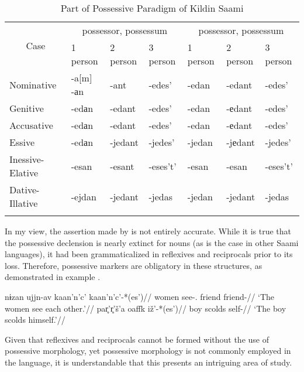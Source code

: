 \begin{table}[ht]
\centering
\begin{tabular}{lllllll}
\toprule
\multicolumn{1}{c}{\multirow{2}{*}{Case}} & \multicolumn{3}{c}{\Sg{} possessor, \Pl{} possessum} & \multicolumn{3}{c}{\Pl{} possessor, \Pl{} possessum}\\
\multicolumn{1}{c}{} & 1 person & 2 person & 3 person & 1 person & 2 person & 3 person \\\midrule

Nominative & \parbox{1.5cm}{-a{[}m{]} \\ -аn} & -ant & -edes' & -edan & -edant & -edes' \\\addlinespace

Genitive & -edаn & -edant & -edes' & -edan & -еdant & -edes' \\\addlinespace

Accusative & -edаn & -edant & -edes' & -edan & -еdant & -edes' \\\addlinespace

Essive & -edаn & -jedant & -jedes' & -jedan & -jеdant & -jedes' \\\addlinespace
\parbox{2cm}{Inessive-Elative} & -esan & -esant & -eses't' & -esan & -esan & -eses't' \\\addlinespace

\parbox{2cm}{Dative-Illative} & -ejdan & -jedant & -jedas & -jedan & -jedant & -jedas \\\addlinespace
\bottomrule
\end{tabular}
\caption{Part of Possessive Paradigm of Kildin Saami}\label{saami_poss2}
\end{table}

    In my view, the assertion made by \cite{riesler_kildin_2022} is not entirely accurate. While it is true that the possessive declension is nearly extinct for nouns (as is the case in other Saami languages), it had been grammaticalized in reflexives and reciprocals prior to its loss. Therefore, possessive markers are obligatory in these structures, as demonstrated in example .

    \pex \label{refl_recip}
    \a \begingl
    \gla nɨzan ujjn-av kaan'n'c' kaan'n'c'-*(es')//
    \glb women see-\Npst.\Tpl{} friend friend-\Poss{}\Third{}//
    \glft `The women see each other.'//
    \endgl
    \a \begingl
    \gla par̥'r̥'š'a oaffk iž'-*(es')//
    \glb boy scolds self-\Poss{}\Third{}//
    \glft `The boy scolds himself.'//
    \endgl
    \xe

    Given that reflexives and reciprocals cannot be formed without the use of possessive morphology, yet possessive morphology is not commonly employed in the language, it is understandable that this presents an intriguing area of study.

